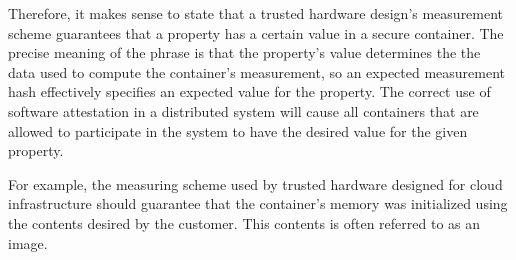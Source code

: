 Therefore, it makes sense to state that a trusted hardware design's measurement
scheme guarantees that a property has a certain value in a secure container.
The precise meaning of the phrase is that the property's value determines the
the data used to compute the container's measurement, so an expected
measurement hash effectively specifies an expected value for the property. The
correct use of software attestation in a distributed system will cause all
containers that are allowed to participate in the system to have the desired
value for the given property.

For example, the measuring scheme used by trusted hardware designed for cloud
infrastructure should guarantee that the container's memory was initialized
using the contents desired by the customer. This contents is often referred to
as an image.
